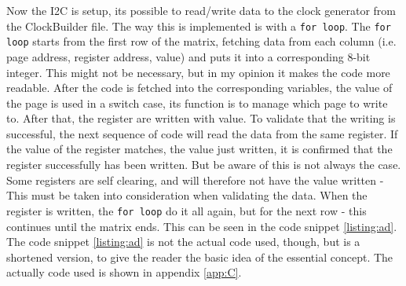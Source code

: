 \noindent Now the I2C is setup, its possible to read/write data to the clock generator from the ClockBuilder file. The way this is implemented is with a \texttt{for loop}. The \texttt{for loop} starts from the first row of the matrix, fetching data from each column (i.e. page address, register address, value) and puts it into a corresponding 8-bit integer. This might not be necessary, but in my opinion it makes the code more readable. 
After the code is fetched into the corresponding variables, the value of the page is used in a switch case, its function is to manage which page to write to. After that, the register are written with value.
To validate that the writing is successful, the next sequence of code will read the data from the same register. If the value of the register matches, the value just written, it is confirmed that the register successfully has been written. But be aware of this is not always the case. Some registers are self clearing, and will therefore not have the value written - This must be taken into consideration when validating the data. When the register is written, the \texttt{for loop} do it all again, but for the next row - this continues until the matrix ends. This can be seen in the code snippet \ref{listing:ad}. The code snippet \ref{listing:ad} is not the actual code used, though, but is a shortened version, to give the reader the basic idea of the essential concept. The actually code used is shown in appendix \ref{app:C}.


